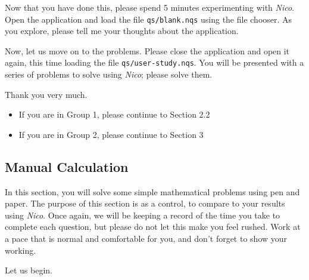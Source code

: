 \documentclass[14pt]{article}
\begin{document}
Now that you have done this, please spend 5 minutes experimenting with
\emph{Nico}.  Open the application and load the file \verb¬qs/blank.nqs¬ using
the file chooser.  As you explore, please tell me your thoughts about the
application.

Now, let us move on to the problems.  Please close the application and open it
again, this time loading the file \verb¬qs/user-study.nqs¬.  You will be
presented with a series of problems to solve using \emph{Nico}; please solve
them.

Thank you very much.

\begin{itemize}
\item If you are in Group 1, please continue to Section 2.2
\item If you are in Group 2, please continue to Section 3
\end{itemize}

\pagebreak

\subsection{Manual Calculation}

In this section, you will solve some simple mathematical problems using pen
and paper.  The purpose of this section is as a control, to compare to your
results using \emph{Nico}.  Once again, we will be keeping a record of the time
you take to complete each question, but please do not let this make you feel
rushed.  Work at a pace that is normal and comfortable for you, and don't forget
to show your working.

Let us begin.

\end{document}
